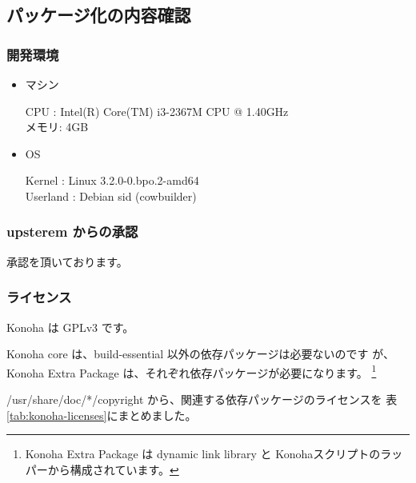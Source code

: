 \documentclass[mingoth,a4paper]{jsarticle}
\begin{document}
\subsection{パッケージ化の内容確認}
\subsubsection{開発環境}
\begin{itemize}
\item マシン

    CPU   : Intel(R) Core(TM) i3-2367M CPU @ 1.40GHz\\
    メモリ: 4GB
\item OS

    Kernel   : Linux 3.2.0-0.bpo.2-amd64\\
    Userland : Debian sid (cowbuilder)
\end{itemize}
\subsubsection{upsterem からの承認}
承認を頂いております。

\subsubsection{ライセンス}
Konoha は GPLv3 です。

Konoha core は、build-essential 以外の依存パッケージは必要ないのです
が、Konoha Extra Package は、それぞれ依存パッケージが必要になります。
\footnote{Konoha Extra Package は dynamic link library と Konohaスクリプトのラッパーから構成されています。}

/usr/share/doc/*/copyright から、関連する依存パッケージのライセンスを
表\ref{tab:konoha-licenses}にまとめました。
\end{document}
